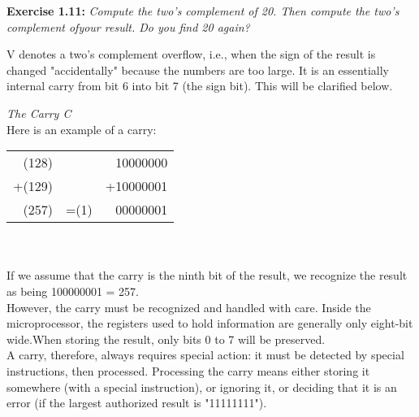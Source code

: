 \documentclass[12pt]{book}
\begin{document}
\noindent\textbf{Exercise 1.11:} \textit{Compute the two's complement of 20. Then compute the two's complement ofyour result. Do you find 20 again?}\\


V denotes a two's complement overflow, i.e., when the sign of the result is changed "accidentally" because the numbers are too large. It is an essentially internal carry from bit 6 into bit 7 (the sign bit). This will be clarified below.\\


\noindent\textit{The Carry C}\\

Here is an example of a carry:
\begin{table}[H]\begin{center}
\begin{tabular}{rcr}
(128)  &      & 10000000  \\
+(129) &      & +10000001 \\ \hline
(257)  & =(1) & 00000001 
\end{tabular}\end{center}
\end{table}
\\

\\

If we assume that the carry is the ninth bit of the result, we recognize the result as being 100000001 = 257.\\

However, the carry must be recognized and handled with care. Inside the microprocessor, the registers used to hold information are generally only eight-bit wide.When storing the result, only bits 0 to 7 will be preserved.\\

A carry, therefore, always requires special action: it must be detected by special instructions, then processed. Processing the carry means either storing it somewhere (with a special instruction), or ignoring it, or deciding that it is an error (if the largest authorized result is "11111111").\\
\end{document}
